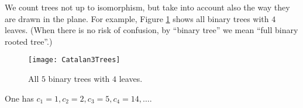 

\setcounter{section}{4}
\setcounter{subsection}{1}
\setcounter{dfn}{1}

We count trees not up to isomorphism, but take into account also the way they are drawn in the plane.
For example, Figure \ref{fig:Catalan3Trees} shows all binary trees with $4$ leaves.
(When there is no risk of confusion, by ``binary tree'' we mean ``full binary rooted tree''.)

\begin{figure}[ht]
\begin{center}
\texttt{[image: Catalan3Trees]}
\end{center}
\caption{All $5$ binary trees with $4$ leaves.}
\label{fig:Catalan3Trees}
\end{figure}

One has $c_1 = 1, c_2 = 2, c_3 = 5, c_4 = 14, \ldots$.



